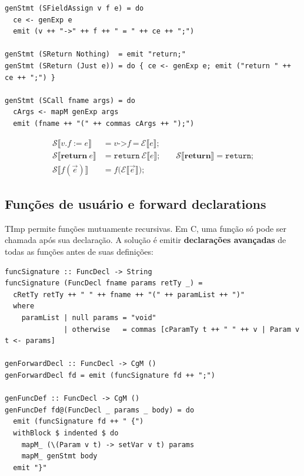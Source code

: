 \begin{verbatim}
genStmt (SFieldAssign v f e) = do
  ce <- genExp e
  emit (v ++ "->" ++ f ++ " = " ++ ce ++ ";")

genStmt (SReturn Nothing)  = emit "return;"
genStmt (SReturn (Just e)) = do { ce <- genExp e; emit ("return " ++ ce ++ ";") }

genStmt (SCall fname args) = do
  cArgs <- mapM genExp args
  emit (fname ++ "(" ++ commas cArgs ++ ");")
\end{verbatim}

\begin{Definition}\label{def:timp-stmt}
  \begin{align*}
    \mathcal{S}\llbracket v.f \mathrel{:=} e \rrbracket
    &= v\texttt{->}f\ \texttt{=}\ \mathcal{E}\llbracket e\rrbracket\texttt{;} \\
    \mathcal{S}\llbracket \mathbf{return}\ e \rrbracket
    &= \texttt{return}\ \mathcal{E}\llbracket e\rrbracket\texttt{;} \qquad
    \mathcal{S}\llbracket \mathbf{return} \rrbracket = \texttt{return;} \\
    \mathcal{S}\llbracket f(\vec{e}) \rrbracket
    &= f\texttt{(}\mathcal{E}\llbracket \vec{e}\rrbracket\texttt{);}
  \end{align*}
\end{Definition}

\subsection{Funções de usuário e forward declarations}

TImp permite funções mutuamente recursivas.  Em C, uma função só pode ser
chamada após sua declaração.  A solução é emitir \textbf{declarações avançadas}
de todas as funções antes de suas definições:

\begin{verbatim}
funcSignature :: FuncDecl -> String
funcSignature (FuncDecl fname params retTy _) =
  cRetTy retTy ++ " " ++ fname ++ "(" ++ paramList ++ ")"
  where
    paramList | null params = "void"
              | otherwise   = commas [cParamTy t ++ " " ++ v | Param v t <- params]

genForwardDecl :: FuncDecl -> CgM ()
genForwardDecl fd = emit (funcSignature fd ++ ";")

genFuncDef :: FuncDecl -> CgM ()
genFuncDef fd@(FuncDecl _ params _ body) = do
  emit (funcSignature fd ++ " {")
  withBlock $ indented $ do
    mapM_ (\(Param v t) -> setVar v t) params
    mapM_ genStmt body
  emit "}"
\end{verbatim}

